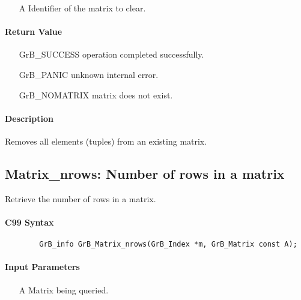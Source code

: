 \begin{itemize}[leftmargin=1.1in]
    \item[{\sf A}] Identifier of the matrix to clear.
\end{itemize}

\paragraph{Return Value}

\begin{itemize}[leftmargin=2.1in]
\item[{\sf GrB\_SUCCESS}]   operation completed successfully.
\item[{\sf GrB\_PANIC}]     unknown internal error.
\item[{\sf GrB\_NOMATRIX}]  matrix does not exist.
\end{itemize}

\paragraph{Description}

Removes all elements (tuples) from an existing matrix.

\subsection{{\sf Matrix\_nrows}: Number of rows in a matrix}

Retrieve the number of rows in a matrix.

\paragraph{C99 Syntax}

\begin{verbatim}
        GrB_info GrB_Matrix_nrows(GrB_Index *m, GrB_Matrix const A);
\end{verbatim}

\paragraph{Input Parameters}

\begin{itemize}[leftmargin=1.1in]
    \item[{\sf A}] Matrix being queried.
\end{itemize}

